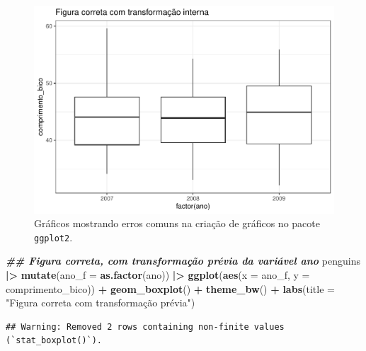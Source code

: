 \documentclass[
]{article}
\newenvironment{Shaded}{\begin{snugshade}}{\end{snugshade}}
\newcommand{\AttributeTok}[1]{\textcolor[rgb]{0.13,0.29,0.53}{#1}}
\newcommand{\DocumentationTok}[1]{\textcolor[rgb]{0.56,0.35,0.01}{\textbf{\textit{#1}}}}
\newcommand{\FunctionTok}[1]{\textcolor[rgb]{0.13,0.29,0.53}{\textbf{#1}}}
\newcommand{\NormalTok}[1]{#1}
\newcommand{\SpecialCharTok}[1]{\textcolor[rgb]{0.81,0.36,0.00}{\textbf{#1}}}
\newcommand{\StringTok}[1]{\textcolor[rgb]{0.31,0.60,0.02}{#1}}
\begin{document}
\begin{figure}
\centering
\includegraphics{epr_files/figure-latex/fig-plot-error-2.pdf}
\caption{\label{fig:fig-plot-error-2}Gráficos mostrando erros comuns na criação de gráficos no pacote \texttt{ggplot2}.}
\end{figure}

\begin{Shaded}
\begin{Highlighting}[]
\DocumentationTok{\#\# Figura correta, com transformação prévia da variável ano}
\NormalTok{penguins }\SpecialCharTok{|\textgreater{}}
    \FunctionTok{mutate}\NormalTok{(}\AttributeTok{ano\_f =} \FunctionTok{as.factor}\NormalTok{(ano)) }\SpecialCharTok{|\textgreater{}} 
    \FunctionTok{ggplot}\NormalTok{(}\FunctionTok{aes}\NormalTok{(}\AttributeTok{x =}\NormalTok{ ano\_f, }\AttributeTok{y =}\NormalTok{ comprimento\_bico)) }\SpecialCharTok{+}
    \FunctionTok{geom\_boxplot}\NormalTok{() }\SpecialCharTok{+} 
    \FunctionTok{theme\_bw}\NormalTok{() }\SpecialCharTok{+}
    \FunctionTok{labs}\NormalTok{(}\AttributeTok{title =} \StringTok{"Figura correta com transformação prévia"}\NormalTok{)}
\end{Highlighting}
\end{Shaded}

\begin{verbatim}
## Warning: Removed 2 rows containing non-finite values (`stat_boxplot()`).
\end{verbatim}
\end{document}
